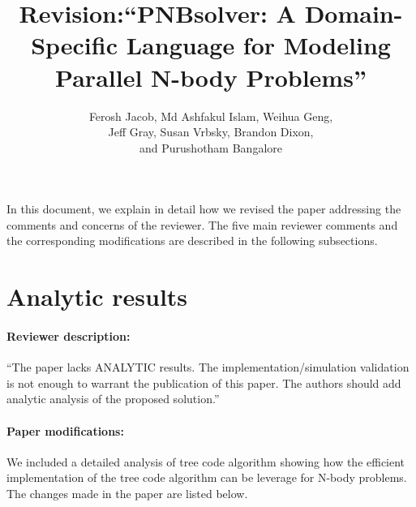 \documentclass[11pt,a4paper]{article}
\title{Revision:``PNBsolver: A Domain-Specific Language for Modeling Parallel N-body Problems''}
\author{Ferosh Jacob, Md Ashfakul Islam, Weihua Geng, \\ Jeff Gray, Susan Vrbsky, Brandon Dixon,\\ and Purushotham Bangalore}
\begin{document}
\maketitle

In this document, we explain in detail how we revised the paper addressing the comments and concerns of the reviewer. The five main reviewer comments and the corresponding modifications are described in the following subsections.


\section {Analytic results}
\paragraph{Reviewer description:}``The paper lacks ANALYTIC results. The implementation/simulation validation is not enough to warrant the publication of this paper. The authors should add analytic analysis of the proposed solution.''
\paragraph{Paper modifications:} We included a detailed analysis of tree code algorithm showing how the efficient implementation of the tree code algorithm can be leverage for N-body problems.   
The changes made in the paper are listed below. 
\end{document}
